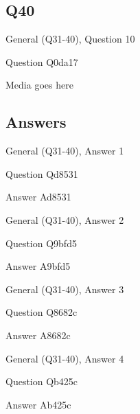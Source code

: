 \documentclass[11pt]{beamer}
\begin{document}
\subsection*{Q40}
\begin{frame}[t]{General (Q31-40), Question 10}
\vspace{2em}
\begin{block}{Question}
Q0da17
\end{block}
\begin{center}
Media goes here
\end{center}
\end{frame}
    
\subsection{Answers}

\begin{frame}[t]{General (Q31-40), Answer 1}
\vspace{2em}
\begin{block}{Question}
Qd8531
\end{block}
\pause{}
\begin{block}{Answer}
Ad8531
\end{block}
\end{frame}
    

\begin{frame}[t]{General (Q31-40), Answer 2}
\vspace{2em}
\begin{block}{Question}
Q9bfd5
\end{block}
\pause{}
\begin{block}{Answer}
A9bfd5
\end{block}
\end{frame}
    

\begin{frame}[t]{General (Q31-40), Answer 3}
\vspace{2em}
\begin{block}{Question}
Q8682c
\end{block}
\pause{}
\begin{block}{Answer}
A8682c
\end{block}
\end{frame}
    

\begin{frame}[t]{General (Q31-40), Answer 4}
\vspace{2em}
\begin{block}{Question}
Qb425c
\end{block}
\pause{}
\begin{block}{Answer}
Ab425c
\end{block}
\end{frame}
    
\end{document}
